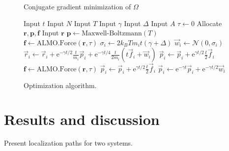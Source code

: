 \documentclass[aps,prl,reprint,amsmath,amssymb]{revtex4-1}
\begin{document}
\begin{figure}
\begin{algorithm}[H]
  \caption{Conjugate gradient minimization of $\Omega$}
  \label{alg:cg}
   \begin{algorithmic}[1]
   	\State Input $t$ 
   	\State Input $N$ 
   	\State Input $T$ 
   	\State Input $\gamma$ 
   	\State Input $\Delta$  \label{line:delta1}
   	\State Input $A$ 
	\State $\tau\gets 0$ 
	\State Allocate $\mathbf{r}, \mathbf{p}, \mathbf{f}$ 
   	\State Input $\mathbf{r}$
	\State $\mathbf{p} \gets \text{Maxwell-Boltzmann}(T)$ 
	\State $\mathbf{f} \gets \text{ALMO.Force}(\mathbf{r},\tau)$ 
	 
		 
			\State $\sigma_i \gets 2 k_B T m_i t (\gamma + \Delta)$  \label{line:delta2}
			\State $\vec{w}_{i} \gets \mathcal{N}(0,\sigma_i)$ 
			\State $\vec{r}_i \gets \vec{r}_i + \mathrm{e}^{-\gamma t/2} \frac{t}{m_i}\vec{p}_i + \mathrm{e}^{-\gamma t/4} \frac{t}{2 m_i} \left( t \vec{f}_i + \vec{w}_i \right) $
			\State $\vec{p}_i \gets \vec{p}_i + \mathrm{e}^{\gamma t/2} \frac{t}{2} \vec{f}_i$ 
		\EndFor
		\State $\mathbf{f} \gets \text{ALMO.Force}(\mathbf{r},\tau)$ 
			\State $\vec{p}_i \gets \vec{p}_i + \mathrm{e}^{\gamma t/2} \frac{t}{2} \vec{f}_i $
			\State $\vec{p}_i \gets \mathrm{e}^{-\gamma t} \vec{p}_i + \mathrm{e}^{-\gamma t/2} \vec{w}_i $   
		\EndFor
	\EndFor
   \end{algorithmic}
\end{algorithm}
\caption{\label{fig:cg} Optimization algorithm.}
\end{figure}


\section{Results and discussion}

Present localization paths for two systems.
\end{document}
